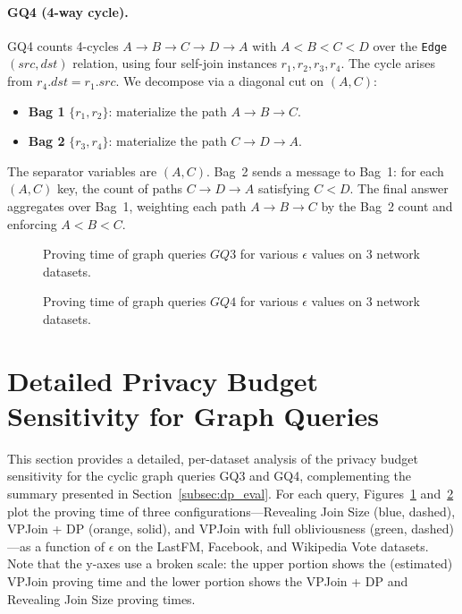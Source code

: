 \documentclass[sigconf]{acmart}
\begin{document}
\paragraph{GQ4 (4-way cycle).}
GQ4 counts 4-cycles $A \to B \to C \to D \to A$ with $A < B < C < D$ over the \texttt{Edge}$(src, dst)$ relation, using four self-join instances $r_1, r_2, r_3, r_4$. The cycle arises from $r_4.dst = r_1.src$. We decompose via a diagonal cut on $(A, C)$:
\begin{itemize}[leftmargin=*, itemsep=0.1em]
    \item \textbf{Bag 1} $\{r_1, r_2\}$: materialize the path $A \to B \to C$.
    \item \textbf{Bag 2} $\{r_3, r_4\}$: materialize the path $C \to D \to A$.
\end{itemize}
The separator variables are $(A, C)$. Bag~2 sends a message to Bag~1: for each $(A, C)$ key, the count of paths $C \to D \to A$ satisfying $C < D$. The final answer aggregates over Bag~1, weighting each path $A \to B \to C$ by the Bag~2 count and enforcing $A < B < C$.

\begin{figure}
\centerline{ }
\captionsetup{skip=2pt} 
\caption{Proving time of graph queries $GQ3$ for various $\epsilon$ values on $3$ network datasets.}
\label{fig:gq3_privacy}
\vspace{-0.2in}
\end{figure}

\begin{figure}
\centerline{ }
\captionsetup{skip=2pt} 
\caption{Proving time of graph queries $GQ4$ for various $\epsilon$ values on $3$ network datasets.}
\label{fig:gq4_privacy}
\vspace{-0.2in}
\end{figure}

\section{Detailed Privacy Budget Sensitivity for Graph Queries}
\label{app:dp_sensitivity}

This section provides a detailed, per-dataset analysis of the privacy budget sensitivity for the cyclic graph queries GQ3 and GQ4, complementing the summary presented in Section~\ref{subsec:dp_eval}. For each query, Figures~\ref{fig:gq3_privacy} and~\ref{fig:gq4_privacy} plot the proving time of three configurations---Revealing Join Size (blue, dashed), VPJoin + DP (orange, solid), and VPJoin with full obliviousness (green, dashed)---as a function of $\epsilon$ on the LastFM, Facebook, and Wikipedia Vote datasets. Note that the y-axes use a broken scale: the upper portion shows the (estimated) VPJoin proving time and the lower portion shows the VPJoin + DP and Revealing Join Size proving times.
\end{document}

